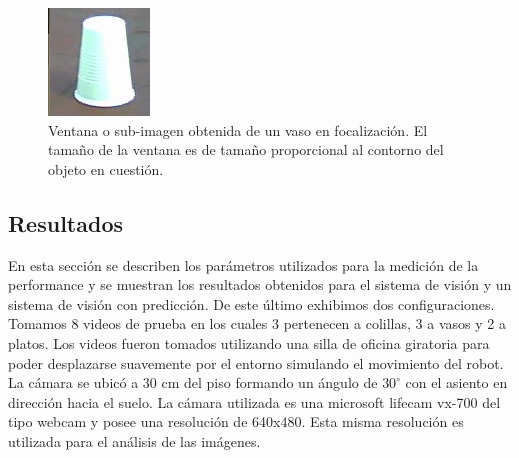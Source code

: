 \begin{figure}[htpb]
\begin{center}
  \includegraphics[scale=0.6]{vision/figures/ventana-2.png}
\end{center}
  \caption[Ejemplo de ventana]{\small Ventana o sub-imagen obtenida de un vaso en 
  focalizaci\'on. El tama\~no de la ventana es de tama\~no proporcional al 
  contorno del objeto en cuesti\'on.}
  \label{fig:ventaneo_2}
\end{figure}

	
	
\subsection{Resultados}
En esta secci\'on se describen los par\'ametros utilizados para la 
medici\'on de la performance y se muestran los resultados obtenidos para 
el sistema de visi\'on y un sistema de visi\'on con predicci\'on. De este 
\'ultimo exhibimos dos configuraciones. Tomamos 8 videos de prueba en los cuales 3 pertenecen a 
colillas, 3 a vasos y 2 a platos. Los videos fueron tomados utilizando 
una silla de oficina giratoria para poder desplazarse suavemente por 
el entorno simulando el movimiento del robot. La c\'amara se ubic\'o a 30 
cm del piso formando un \'angulo de $30^{\circ}$ con el asiento  en direcci\'on 
hacia el suelo. La c\'amara utilizada es una microsoft lifecam vx-700 del tipo webcam y posee una 
resoluci\'on de 640x480. Esta misma resoluci\'on es utilizada para el an\'alisis de las im\'agenes.

